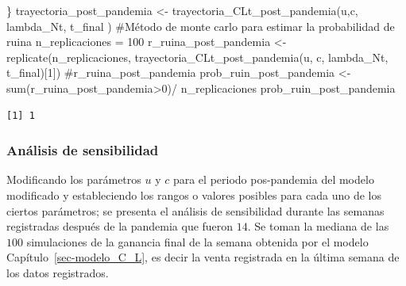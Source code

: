 \documentclass[
  us-letterpaper,
]{scrreprt}
\newenvironment{Shaded}{\begin{snugshade}}{\end{snugshade}}
\newcommand{\CommentTok}[1]{\textcolor[rgb]{0.37,0.37,0.37}{#1}}
\newcommand{\DecValTok}[1]{\textcolor[rgb]{0.68,0.00,0.00}{#1}}
\newcommand{\FunctionTok}[1]{\textcolor[rgb]{0.28,0.35,0.67}{#1}}
\newcommand{\NormalTok}[1]{\textcolor[rgb]{0.00,0.23,0.31}{#1}}
\newcommand{\OtherTok}[1]{\textcolor[rgb]{0.00,0.23,0.31}{#1}}
\newcommand{\SpecialCharTok}[1]{\textcolor[rgb]{0.37,0.37,0.37}{#1}}
\theoremstyle{plain}
\theoremstyle{plain}
\theoremstyle{definition}
\theoremstyle{remark}
\begin{document}
\begin{Shaded}
\begin{Highlighting}[]
\NormalTok{\}}
\NormalTok{trayectoria\_post\_pandemia }\OtherTok{\textless{}{-}} \FunctionTok{trayectoria\_CLt\_post\_pandemia}\NormalTok{(u,c,}
\NormalTok{                                            lambda\_Nt, t\_final )}
\CommentTok{\#Método de monte carlo para estimar la probabilidad de ruina}
\NormalTok{n\_replicaciones }\OtherTok{=} \DecValTok{100}
\NormalTok{r\_ruina\_post\_pandemia }\OtherTok{\textless{}{-}} \FunctionTok{replicate}\NormalTok{(n\_replicaciones,}
                          \FunctionTok{trayectoria\_CLt\_post\_pandemia}\NormalTok{(u, c, }
\NormalTok{                                          lambda\_Nt, t\_final)[}\DecValTok{1}\NormalTok{])}
\CommentTok{\#r\_ruina\_post\_pandemia}
\NormalTok{prob\_ruin\_post\_pandemia }\OtherTok{\textless{}{-}} \FunctionTok{sum}\NormalTok{(r\_ruina\_post\_pandemia}\SpecialCharTok{\textgreater{}}\DecValTok{0}\NormalTok{)}\SpecialCharTok{/}
\NormalTok{n\_replicaciones}
\NormalTok{prob\_ruin\_post\_pandemia}
\end{Highlighting}
\end{Shaded}

\begin{verbatim}
[1] 1
\end{verbatim}

\subsubsection{Análisis de
sensibilidad}\label{anuxe1lisis-de-sensibilidad-1}

Modificando los parámetros \(u\) y \(c\) para el periodo pos-pandemia
del modelo modificado y estableciendo los rangos o valores posibles para
cada uno de los ciertos parámetros; se presenta el análisis de
sensibilidad durante las semanas registradas después de la pandemia que
fueron \(14\). Se toman la mediana de las \(100\) simulaciones de la
ganancia final de la semana obtenida por el modelo
Capítulo~\ref{sec-modelo_C_L}, es decir la venta registrada en la última
semana de los datos registrados.
\end{document}

